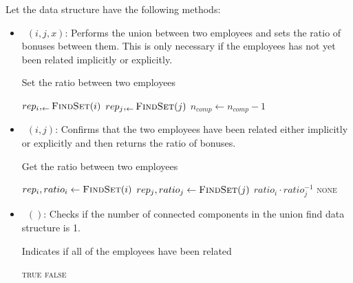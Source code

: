 \documentclass[12pt,twoside]{article}
\begin{document}
\begin{problems}
Let the data structure have the following methods:
\begin{itemize}
    \item\ $(i, j, x)$: Performs the union between two 
        employees and sets the ratio of bonuses between them. This is only
        necessary if the employees has not yet been related implicitly or 
        explicitly.
        \begin{breakablealgorithm}
            \caption{Set the ratio between two employees}
            \begin{algorithmic}[1]
                    \State $rep_i, _ \leftarrow \Call{FindSet}{i}$
                    \State $rep_j, _ \leftarrow \Call{FindSet}{j}$
                        \State $n_{comp} \leftarrow n_{comp} - 1$
                        \State {}
                    \EndIf
                \EndFunction
            \end{algorithmic}
        \end{breakablealgorithm}
    \item\ $(i, j)$: Confirms that the two employees have
        been related either implicitly or explicitly and then returns the ratio
        of bonuses.
        \begin{breakablealgorithm}
            \caption{Get the ratio between two employees}
            \begin{algorithmic}[1]
                    \State $rep_i, ratio_i \leftarrow \Call{FindSet}{i}$
                    \State $rep_j, ratio_j \leftarrow \Call{FindSet}{j}$
                        \State \Return $ratio_i \cdot ratio_j^{-1}$ 
                    \Else
                        \State \Return \textsc{none}
                    \EndIf
                \EndFunction
            \end{algorithmic}
        \end{breakablealgorithm}
    \item\ $()$: Checks if the number of connected components
        in the union find data structure is 1.
        \begin{breakablealgorithm}
            \caption{Indicates if all of the employees have been related}
            \begin{algorithmic}[1]
                        \State \Return \textsc{true}
                    \Else
                        \State \Return \textsc{false}
                    \EndIf
                \EndFunction
            \end{algorithmic}
        \end{breakablealgorithm}
\end{itemize}


\end{problems}
\end{document}
